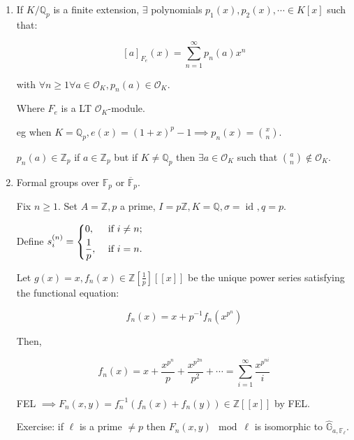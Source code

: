 \documentclass{article}
\theoremstyle{definition}
\numberwithin{theorem}{subsection}
\begin{document}
    \begin{enumerate}[label=\arabic*)]
        \item If \(K / \mathbb{Q}_p\) is a finite extension, \(\exists\) polynomials \(p_1 (x), p_2(x), \cdots \in K[x]\) such that:
        
        \[
            [a]_{F_e}(x) = \sum_{n=1}^{\infty} p_n(a) x^n
        \]

        with \(\forall n \geq 1 \forall a\in \mathcal{O}_K, p_n(a) \in \mathcal{O}_K\).

        Where \(F_e\) is a LT \(\mathcal{O}_K\)-module.

        eg when \(K = \mathbb{Q}_p, e(x) = (1+x)^p - 1 \implies p_n(x) = \binom{x}{n}\).
        
        \(p_n(a) \in \mathbb{Z}_p\) if \(a\in \mathbb{Z}_p\) but if \(K \neq \mathbb{Q}_p\) then \(\exists a\in \mathcal{O}_K\) such that \(\binom{a}{n}\notin \mathcal{O}_K\).

        \item Formal groups over \(\mathbb{F}_p\) or \(\overline{\mathbb{F}}_p\).
        
        Fix \(n \geq 1\). Set \(A = \mathbb{Z}, p\) a prime, \(I = p\mathbb{Z}, K = \mathbb{Q}, \sigma = \operatorname{id}_{}, q = p\).

        Define \(s_i^{(n)} = \begin{dcases}
            0, &\text{ if } i \neq n ;\\
            \frac{1}{p}, &\text{ if } i = n.
        \end{dcases}\) 

        Let \(g(x) = x, f_n(x) \in \mathbb{Z}\left[ \frac{1}{p} \right] [[x]]\) be the unique power series satisfying the functional equation:

        \[
            f_n(x) = x + p ^{-1} f_n(x^{p^n})
        \]

        Then,

        \[
            f_n(x) = x + \frac{x^{p^n}}{p} + \frac{x^{p^{2n}}}{p^2} + \cdots = \sum_{i=1}^{\infty} \frac{x^{p^{ni}}}{i} \tag*{$(\ast)$}
        \]

        FEL \(\implies F_n(x,y) = f_n ^{-1} (f_n(x)+f_n(y))\in \mathbb{Z} [[x]]\) by FEL.

        Exercise: if \(\ell\) is a prime \(\neq p\) then \(F_n(x,y)\mod \ell\) is isomorphic to \(\widehat{\mathbb{G}}_{a,\mathbb{F}_\ell}\).
        
    \end{enumerate} 
\end{document}
